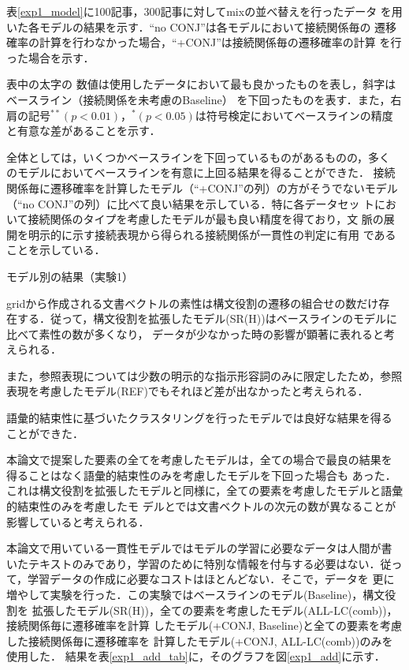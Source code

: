 \documentclass[japanese]{jnlp_1.4}
\begin{document}
 表\ref{exp1_model}に100記事，300記事に対してmixの並べ替えを行ったデータ
 を用いた各モデルの結果を示す．``no CONJ''は各モデルにおいて接続関係毎の
 遷移確率の計算を行わなかった場合，``+CONJ''は接続関係毎の遷移確率の計算
 を行った場合を示す．
 

 表中の太字の
 数値は使用したデータにおいて最も良かったものを表し，斜字は
 ベースライン（接続関係を未考慮のBaseline）
 を下回ったものを表す．また，右肩の記号$ ^{**} (p < 0.01)$，$ ^{*} (p
 < 0.05)$は符号検定においてベースラインの精度と有意な差があることを示す．

 全体としては，いくつかベースラインを下回っているものがあるものの，多く
 のモデルにおいてベースラインを有意に上回る結果を得ることができた．
 接続関係毎に遷移確率を計算したモデル（``+CONJ''の列）の方がそうでないモデル
 （``no CONJ''の列）に比べて良い結果を示している．特に各データセッ
 トにおいて接続関係のタイプを考慮したモデルが最も良い精度を得ており，文
 脈の展開を明示的に示す接続表現から得られる接続関係が一貫性の判定に有用
 であることを示している．

\begin{table}[t]
  \caption{モデル別の結果（実験1）}\label{exp1_model}

\end{table}

 gridから作成される文書ベクトルの素性は構文役割の遷移の組合せの数だけ存
 在する．従って，構文役割を拡張したモデル(SR(H))はベースラインのモデルに
 比べて素性の数が多くなり，
 データが少なかった時の影響が顕著に表れると考えられる．

 また，参照表現については少数の明示的な指示形容詞のみに限定したため，参照
 表現を考慮したモデル(REF)でもそれほど差が出なかったと考えられる．

 語彙的結束性に基づいたクラスタリングを行ったモデルでは良好な結果を得る
 ことができた．

 本論文で提案した要素の全てを考慮したモデルは，全ての場合で最良の結果を
 得ることはなく語彙的結束性のみを考慮したモデルを下回った場合も
 あった．これは構文役割を拡張したモデルと同様に，全ての要素を考慮したモデルと語彙的結束性のみを考慮したモ
 デルとでは文書ベクトルの次元の数が異なることが影響していると考えられる．

 本論文で用いている一貫性モデルではモデルの学習に必要なデータは人間が書
 いたテキストのみであり，学習のために特別な情報を付与する必要はない．従っ
 て，学習データの作成に必要なコストはほとんどない．そこで，データを
 更に増やして実験を行った．この実験ではベースラインのモデル(Baseline)，構文役割を
 拡張したモデル(SR(H))，全ての要素を考慮したモデル(ALL-LC(comb))，接続関係毎に遷移確率を計算
 したモデル(+CONJ, Baseline)と全ての要素を考慮した接続関係毎に遷移確率を
 計算したモデル(+CONJ, ALL-LC(comb))のみを使用した．
 結果を表\ref{exp1_add_tab}に，そのグラフを図\ref{exp1_add}に示す．
\end{document}
